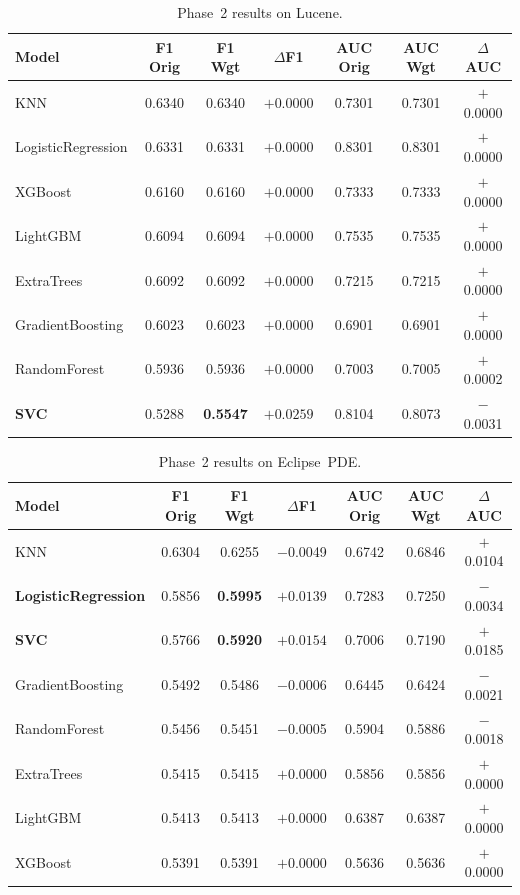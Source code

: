 \documentclass[12pt, a4paper]{article}
\begin{document}
\begin{table}[H]
\caption{Phase~2 results on Lucene.}
\label{tab:lucene}
\centering
\small
\renewcommand{\arraystretch}{1.2}
\begin{tabular}{@{}lcccccc@{}}
\toprule
\textbf{Model}
  & \textbf{F1 Orig} & \textbf{F1 Wgt} & \textbf{$\Delta$F1}
  & \textbf{AUC Orig} & \textbf{AUC Wgt} & \textbf{$\Delta$AUC} \\
\midrule
KNN                & 0.6340 & 0.6340 & $+$0.0000 & 0.7301 & 0.7301 & $+$0.0000 \\
LogisticRegression & 0.6331 & 0.6331 & $+$0.0000 & 0.8301 & 0.8301 & $+$0.0000 \\
XGBoost            & 0.6160 & 0.6160 & $+$0.0000 & 0.7333 & 0.7333 & $+$0.0000 \\
LightGBM           & 0.6094 & 0.6094 & $+$0.0000 & 0.7535 & 0.7535 & $+$0.0000 \\
ExtraTrees         & 0.6092 & 0.6092 & $+$0.0000 & 0.7215 & 0.7215 & $+$0.0000 \\
GradientBoosting   & 0.6023 & 0.6023 & $+$0.0000 & 0.6901 & 0.6901 & $+$0.0000 \\
RandomForest       & 0.5936 & 0.5936 & $+$0.0000 & 0.7003 & 0.7005 & $+$0.0002 \\
\textbf{SVC}       & 0.5288 & \textbf{0.5547} & $\mathbf{+0.0259}$
                   & 0.8104 & 0.8073 & $-$0.0031 \\
\bottomrule
\end{tabular}
\end{table}

\begin{table}[H]
\caption{Phase~2 results on Eclipse~PDE.}
\label{tab:pde}
\centering
\small
\renewcommand{\arraystretch}{1.2}
\begin{tabular}{@{}lcccccc@{}}
\toprule
\textbf{Model}
  & \textbf{F1 Orig} & \textbf{F1 Wgt} & \textbf{$\Delta$F1}
  & \textbf{AUC Orig} & \textbf{AUC Wgt} & \textbf{$\Delta$AUC} \\
\midrule
KNN                & 0.6304 & 0.6255 & $-$0.0049 & 0.6742 & 0.6846 & $+$0.0104 \\
\textbf{LogisticRegression}
                   & 0.5856 & \textbf{0.5995} & $\mathbf{+0.0139}$
                   & 0.7283 & 0.7250 & $-$0.0034 \\
\textbf{SVC}       & 0.5766 & \textbf{0.5920} & $\mathbf{+0.0154}$
                   & 0.7006 & 0.7190 & $+$0.0185 \\
GradientBoosting   & 0.5492 & 0.5486 & $-$0.0006 & 0.6445 & 0.6424 & $-$0.0021 \\
RandomForest       & 0.5456 & 0.5451 & $-$0.0005 & 0.5904 & 0.5886 & $-$0.0018 \\
ExtraTrees         & 0.5415 & 0.5415 & $+$0.0000 & 0.5856 & 0.5856 & $+$0.0000 \\
LightGBM           & 0.5413 & 0.5413 & $+$0.0000 & 0.6387 & 0.6387 & $+$0.0000 \\
XGBoost            & 0.5391 & 0.5391 & $+$0.0000 & 0.5636 & 0.5636 & $+$0.0000 \\
\bottomrule
\end{tabular}
\end{table}
\end{document}
